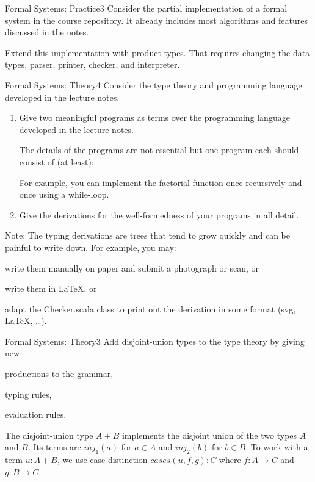 \documentclass[a4paper]{article}
\begin{document}
\header

\begin{problem}{Formal Systems: Practice}{3}
Consider the partial implementation of a formal system in the course repository.
It already includes most algorithms and features discussed in the notes.

Extend this implementation with product types.
That requires changing the data types, parser, printer, checker, and interpreter.
\end{problem}

\begin{problem}{Formal Systems: Theory}{4}
Consider the type theory and programming language developed in the lecture notes.
\begin{enumerate}
\item Give two meaningful programs as terms over the programming language developed in the lecture notes.

The details of the programs are not essential but one program each should consist of (at least):
For example, you can implement the factorial function once recursively and once using a while-loop.

\item Give the derivations for the well-formedness of your programs in all detail.
\end{enumerate}

Note: The typing derivations are trees that tend to grow quickly and can be painful to write down.
For example, you may:
\begin{compactitem}
  \item write them manually on paper and submit a photograph or scan, or
  \item write them in LaTeX, or
  \item adapt the Checker.scala class to print out the derivation in some format (svg, LaTeX, \ldots).
\end{compactitem}
\end{problem}

\begin{problem}{Formal Systems: Theory}{3}
Add disjoint-union types to the type theory by giving new
\begin{compactitem}
 \item productions to the grammar,
 \item typing rules,
 \item evaluation rules.
\end{compactitem}

The disjoint-union type $A+B$ implements the disjoint union of the two types $A$ and $B$.
Its terms are $inj_1(a)$ for $a\in A$ and $inj_2(b)$ for $b\in B$.
To work with a term $u: A+B$, we use case-distinction $cases(u,f,g):C$ where $f:A\to C$ and $g:B\to C$.
\end{problem}
\end{document}
